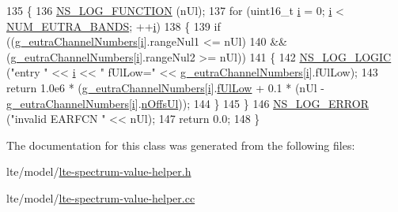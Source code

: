 \begin{DoxyCode}
135 \{
136   \hyperlink{log-macros-disabled_8h_a90b90d5bad1f39cb1b64923ea94c0761}{NS\_LOG\_FUNCTION} (nUl);
137   \textcolor{keywordflow}{for} (uint16\_t \hyperlink{bernuolliDistribution_8m_a6f6ccfcf58b31cb6412107d9d5281426}{i} = 0; \hyperlink{bernuolliDistribution_8m_a6f6ccfcf58b31cb6412107d9d5281426}{i} < \hyperlink{lte-spectrum-value-helper_8cc_a1a0cf1fbef963a28fb2985919229db33}{NUM\_EUTRA\_BANDS}; ++\hyperlink{bernuolliDistribution_8m_a6f6ccfcf58b31cb6412107d9d5281426}{i})
138     \{
139       \textcolor{keywordflow}{if} ((\hyperlink{namespacens3_ac7b6277a31ba13b4793842a10a3d0f44}{g\_eutraChannelNumbers}[\hyperlink{bernuolliDistribution_8m_a6f6ccfcf58b31cb6412107d9d5281426}{i}].rangeNul1 <= nUl)
140           && (\hyperlink{namespacens3_ac7b6277a31ba13b4793842a10a3d0f44}{g\_eutraChannelNumbers}[\hyperlink{bernuolliDistribution_8m_a6f6ccfcf58b31cb6412107d9d5281426}{i}].rangeNul2 >= nUl))
141         \{
142           \hyperlink{group__logging_ga88acd260151caf2db9c0fc84997f45ce}{NS\_LOG\_LOGIC} (\textcolor{stringliteral}{"entry "} << \hyperlink{bernuolliDistribution_8m_a6f6ccfcf58b31cb6412107d9d5281426}{i} << \textcolor{stringliteral}{" fUlLow="} << 
      \hyperlink{namespacens3_ac7b6277a31ba13b4793842a10a3d0f44}{g\_eutraChannelNumbers}[\hyperlink{bernuolliDistribution_8m_a6f6ccfcf58b31cb6412107d9d5281426}{i}].fUlLow);
143           \textcolor{keywordflow}{return} 1.0e6 * (\hyperlink{namespacens3_ac7b6277a31ba13b4793842a10a3d0f44}{g\_eutraChannelNumbers}[\hyperlink{bernuolliDistribution_8m_a6f6ccfcf58b31cb6412107d9d5281426}{i}].\hyperlink{structns3_1_1EutraChannelNumbers_ac399b8ddb10beb25d52f8477b174b5fb}{fUlLow} + 0.1 * (nUl - 
      \hyperlink{namespacens3_ac7b6277a31ba13b4793842a10a3d0f44}{g\_eutraChannelNumbers}[\hyperlink{bernuolliDistribution_8m_a6f6ccfcf58b31cb6412107d9d5281426}{i}].\hyperlink{structns3_1_1EutraChannelNumbers_a9698201d767bf192e59a9a97cd1260be}{nOffsUl}));
144         \}
145     \}
146   \hyperlink{group__logging_ga0261a8db1d4ac5f79417d117634fd455}{NS\_LOG\_ERROR} (\textcolor{stringliteral}{"invalid EARFCN "} << nUl);
147   \textcolor{keywordflow}{return} 0.0;
148 \}
\end{DoxyCode}


The documentation for this class was generated from the following files\+:\begin{DoxyCompactItemize}
\item 
lte/model/\hyperlink{lte-spectrum-value-helper_8h}{lte-\/spectrum-\/value-\/helper.\+h}\item 
lte/model/\hyperlink{lte-spectrum-value-helper_8cc}{lte-\/spectrum-\/value-\/helper.\+cc}\end{DoxyCompactItemize}
